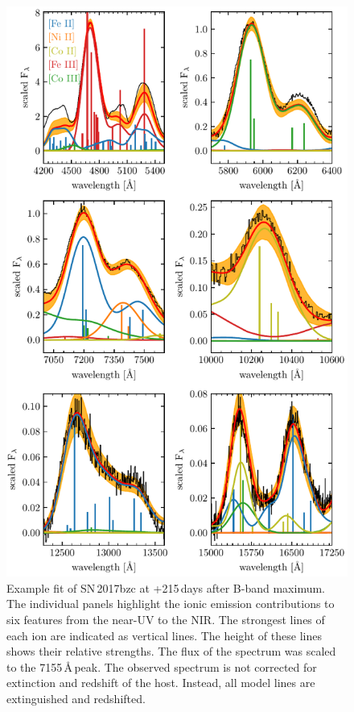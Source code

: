 \documentclass[fleqn,usenatbib]{mnras}
\begin{document}
\begin{figure}
	\includegraphics[width=\linewidth]{plots/example_fit.pdf}
    \caption{Example fit of SN\,2017bzc at +215\,days after B-band maximum. The individual panels highlight the ionic emission contributions to six features from the near-UV to the NIR. The strongest lines of each ion are indicated as vertical lines. The height of these lines shows their relative strengths. The flux of the spectrum was scaled to the 7155\,\AA\,peak. The observed spectrum is not corrected for extinction and redshift of the host. Instead, all model lines are extinguished and redshifted.}
    \label{ExampleFit}
\end{figure}
\end{document}
